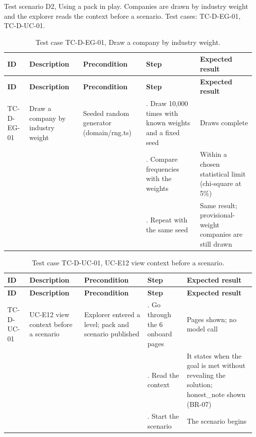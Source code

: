 Test scenario D2, Using a pack in play. Companies are drawn by industry weight and the explorer reads the context before a scenario. Test cases: TC-D-EG-01, TC-D-UC-01.

{\small
\begin{longtable}{|>{\raggedright\arraybackslash}p{}|>{\raggedright\arraybackslash}p{}|>{\raggedright\arraybackslash}p{}|>{\raggedright\arraybackslash}p{}|>{\raggedright\arraybackslash}p{}|}
\caption{Test case TC-D-EG-01, Draw a company by industry weight.} \\
\hline
\textbf{ID} & \textbf{Description} & \textbf{Precondition} & \textbf{Step} & \textbf{Expected result} \\ \hline
\endfirsthead
\hline
\textbf{ID} & \textbf{Description} & \textbf{Precondition} & \textbf{Step} & \textbf{Expected result} \\ \hline
\endhead
TC-D-EG-01 & Draw a company by industry weight & Seeded random generator (domain/rng.ts) & 1. Draw 10,000 times with known weights and a fixed seed & Draws complete \\ \hline
 &  &  & 2. Compare frequencies with the weights & Within a chosen statistical limit (chi-square at 5\%) \\ \hline
 &  &  & 3. Repeat with the same seed & Same result; provisional-weight companies are still drawn \\ \hline
\end{longtable}
}

{\small
\begin{longtable}{|>{\raggedright\arraybackslash}p{}|>{\raggedright\arraybackslash}p{}|>{\raggedright\arraybackslash}p{}|>{\raggedright\arraybackslash}p{}|>{\raggedright\arraybackslash}p{}|}
\caption{Test case TC-D-UC-01, UC-E12 view context before a scenario.} \\
\hline
\textbf{ID} & \textbf{Description} & \textbf{Precondition} & \textbf{Step} & \textbf{Expected result} \\ \hline
\endfirsthead
\hline
\textbf{ID} & \textbf{Description} & \textbf{Precondition} & \textbf{Step} & \textbf{Expected result} \\ \hline
\endhead
TC-D-UC-01 & UC-E12 view context before a scenario & Explorer entered a level; pack and scenario published & 1. Go through the 6 onboard pages & Pages shown; no model call \\ \hline
 &  &  & 2. Read the context & It states when the goal is met without revealing the solution; honest\_note shown (BR-07) \\ \hline
 &  &  & 3. Start the scenario & The scenario begins \\ \hline
\end{longtable}
}

